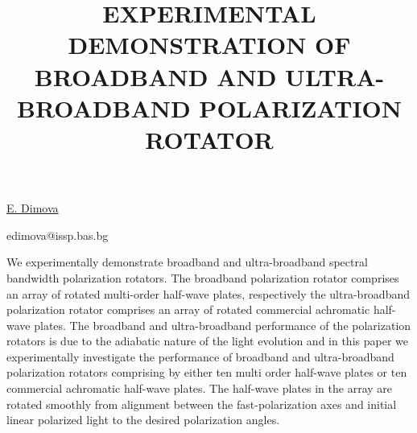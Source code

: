 \title{EXPERIMENTAL DEMONSTRATION OF BROADBAND AND ULTRA-BROADBAND POLARIZATION ROTATOR}

\underline{E. Dimova}%

{\normalsize{
\vspace{-4mm} \ssinstitute



\email edimova@issp.bas.bg}}

We experimentally demonstrate broadband and ultra-broadband spectral
bandwidth polarization rotators. The broadband polarization rotator
comprises an array of rotated multi-order half-wave plates, respectively the
ultra-broadband polarization rotator comprises an array of rotated
commercial achromatic half-wave plates. The broadband and ultra-broadband performance of the
polarization rotators is due to the adiabatic nature of the light evolution
and in this paper we experimentally investigate the performance of broadband
and ultra-broadband polarization rotators comprising by either ten multi
order half-wave plates or ten commercial achromatic half-wave plates. The
half-wave plates in the array are rotated smoothly from alignment between
the fast-polarization axes and initial linear polarized light to the desired
polarization angles.

\vspace{\baselineskip}
